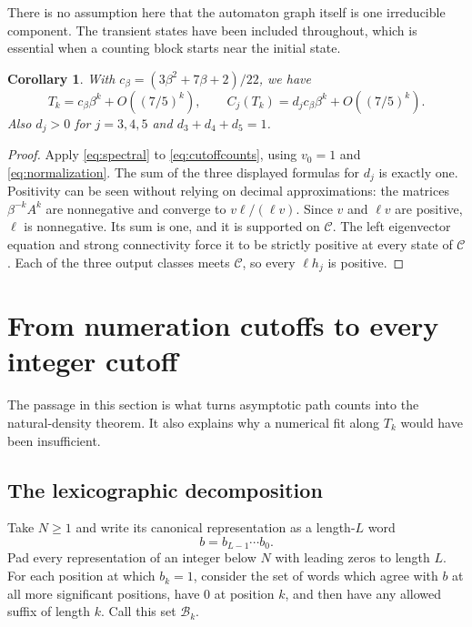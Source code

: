 \documentclass[11pt,a4paper]{article}
\newtheorem{corollary}[theorem]{Corollary}
\theoremstyle{definition}
\theoremstyle{remark}
\newcommand{\cyl}{\mathcal B}
\newcommand{\cc}{\mathcal C}
\begin{document}
There is no assumption here that the automaton graph itself is one
irreducible component. The transient states have been included throughout,
which is essential when a counting block starts near the initial state.

\begin{corollary}\label{cor:Tasymptotic}
With $c_\beta=(3\beta^2+7\beta+2)/22$, we have
\[
 T_k=c_\beta\beta^k+O((7/5)^k),\qquad
 C_j(T_k)=d_jc_\beta\beta^k+O((7/5)^k).
\]
Also $d_j>0$ for $j=3,4,5$ and $d_3+d_4+d_5=1$.
\end{corollary}
\begin{proof}
Apply \eqref{eq:spectral} to \eqref{eq:cutoffcounts}, using $v_0=1$ and
\eqref{eq:normalization}. The sum of the three displayed formulas for $d_j$
is exactly one. Positivity can be seen without relying on decimal
approximations: the matrices $\beta^{-k}A^k$ are nonnegative and converge
to $v\ell/(\ell v)$. Since $v$ and $\ell v$ are positive, $\ell$ is
nonnegative. Its sum is one, and it is supported on $\cc$. The left
eigenvector equation and strong connectivity force it to be strictly
positive at every state of $\cc$. Each of the three output classes meets
$\cc$, so every $\ell h_j$ is positive.
\end{proof}

\section{From numeration cutoffs to every integer cutoff}
\label{sec:allcutoffs}

The passage in this section is what turns asymptotic path counts into the
natural-density theorem. It also explains why a numerical fit along $T_k$
would have been insufficient.

\subsection{The lexicographic decomposition}
Take $N\ge1$ and write its canonical representation as a length-$L$ word
\[
 b=b_{L-1}\cdots b_0.
\]
Pad every representation of an integer below $N$ with leading zeros to
length $L$. For each position at which $b_k=1$, consider the set of words
which agree with $b$ at all more significant positions, have $0$ at
position $k$, and then have any allowed suffix of length $k$. Call this
set $\cyl_k$.
\end{document}

